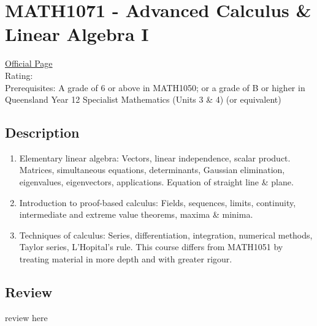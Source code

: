 \hypertarget{MATH1071}{\section{MATH1071 - Advanced Calculus \& Linear Algebra I}}

\large
\textcolor{turbo_purple}{\href{https://my.uq.edu.au/programs-courses/course.html?course_code=MATH1071}{Official Page}} \\
Rating: \cstar\cstar\cstar\cstar\ostar \\
Prerequisites: A grade of 6 or above in MATH1050; or a grade of B or higher in Queensland Year 12 Specialist Mathematics (Units 3 \& 4) (or equivalent)

\normalsize
\subsection*{Description}
\begin{enumerate}
    \item Elementary linear algebra: Vectors, linear independence, scalar product. Matrices, simultaneous equations, determinants, Gaussian elimination, eigenvalues, eigenvectors, applications. Equation of straight line \& plane.
    \item Introduction to proof-based calculus: Fields, sequences, limits, continuity, intermediate and extreme value theorems, maxima \& minima.
    \item Techniques of calculus: Series, differentiation, integration, numerical methods, Taylor series, L'Hopital's rule. This course differs from MATH1051 by treating material in more depth and with greater rigour.
\end{enumerate}

\subsection*{Review}
review here
